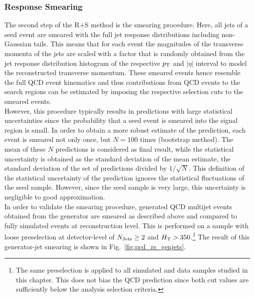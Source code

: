 \subsubsection*{Response Smearing}
\label{subsubsec:qcd_smearing}
The second step of the R+S method is the smearing procedure. Here, all jets of a seed event are smeared with the full jet response distributions including non-Gaussian tails. This means that for each event the magnitudes of the transverse momenta of the jets are scaled with a factor that is randomly obtained from the jet response distribution histogram of the respective $p_{\text{T}}$ and $|\eta|$ interval to model the reconstructed transverse momentum. These smeared events hence resemble the full QCD event kinematics and thus contributions from QCD events to the search regions can be estimated by imposing the respective selection cuts to the smeared events. \\
However, this procedure typically results in predictions with large statistical uncertainties since the probability that a seed event is smeared into the signal region is small. In order to obtain a more robust estimate of the prediction, each event is smeared not only once, but $N = 100$ times (bootstrap method). The mean of these $N$ predictions is considered as final result, while the statistical uncertainty is obtained as the standard deviation of the mean estimate, \ie the standard deviation of the set of predictions divided by $1/\sqrt{N}$. This definition of the statistical uncertainty of the prediction ignores the statistical fluctuations of the seed sample. However, since the seed sample is very large, this uncertainty is negligible to good approximation. \\
In order to validate the smearing procedure, generated QCD multijet events obtained from the \madgraph generator are smeared as described above and compared to fully simulated events at reconstruction level. This is performed on a sample with loose preselection at detector-level of $N_{\text{Jets}} \ge 2$ and $H_{\text{T}} > 350$\gev.\footnote{The same preselection is applied to all simulated and data samples studied in this chapter. This does not bias the QCD prediction since both cut values are sufficiently below the analysis selection criteria.} The result of this generator-jet smearing is shown in Fig.~\ref{fig:qcd_rs_genjets}. 
